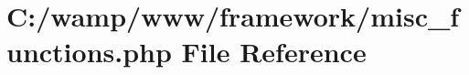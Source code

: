 \hypertarget{misc__functions_8php}{
\section{C:/wamp/www/framework/misc\_\-functions.php File Reference}
\label{misc__functions_8php}
}
